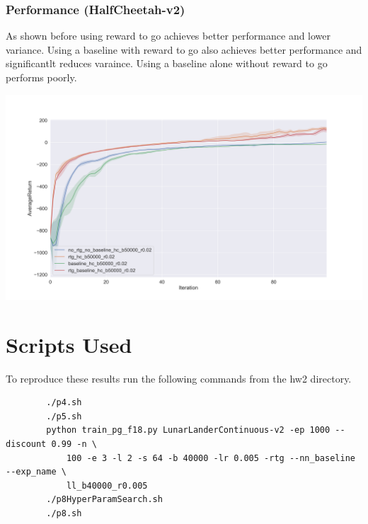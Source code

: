 \documentclass{article}
\begin{document}
    \subsubsection{ Performance (HalfCheetah-v2)}
    As shown before using reward to go achieves better performance and lower variance. Using a baseline with 
    reward to go also achieves better performance and significantlt reduces varaince. Using a baseline alone 
    without reward to go performs poorly.
    \begin{center}
        \noindent\includegraphics[scale=0.3]{cheetah}
    \end{center}

    \section{Scripts Used}

    To reproduce these results run the following commands from the hw2 directory.

    \begin{verbatim}
        ./p4.sh
        ./p5.sh
        python train_pg_f18.py LunarLanderContinuous-v2 -ep 1000 --discount 0.99 -n \
            100 -e 3 -l 2 -s 64 -b 40000 -lr 0.005 -rtg --nn_baseline --exp_name \
            ll_b40000_r0.005
        ./p8HyperParamSearch.sh
        ./p8.sh
    \end{verbatim}
\end{document}
